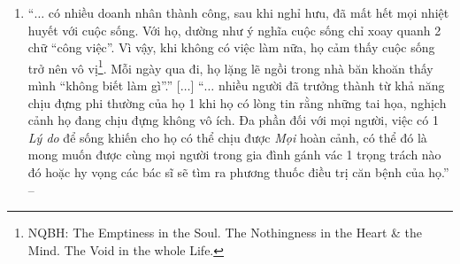 \documentclass[oneside]{book}
\numberwithin{equation}{section}
\begin{document}
\begin{enumerate}[leftmargin=0mm]
	``Frankl would have argued that we are never left with nothing as long as we retain\footnote{\textbf{retain} [v] \textbf{1.} \textbf{retain somebody\texttt{/}something} to keep somebody\texttt{/}something; to continue to have something \& not lose it or get rid of it; \textbf{2.} \textbf{retain something}to take in a substance \& keep holding it; \textbf{3.} \textbf{retain something} to remember or continue to hold something; \textbf{4.} \textbf{retain somebody\texttt{/}something} (\textit{law}) to employ a professional person such as a lawyer or doctor; to make regular payments to such a person in order to keep their services.} the freedom to choose how we will respond.'' -- \cite[Preface by \textsc{Harold S. Kushner}, p. 10]{Frankl2013}
	\item ``$\ldots$ có nhiều doanh nhân thành công, sau khi nghỉ hưu, đã mất hết mọi nhiệt huyết với cuộc sống. Với họ, dường như ý nghĩa cuộc sống chỉ xoay quanh 2 chữ ``công việc''. Vì vậy, khi không có việc làm nữa, họ cảm thấy cuộc sống trở nên vô vị\footnote{NQBH: The Emptiness in the Soul. The Nothingness in the Heart \& the Mind. The Void in the whole Life.}. Mỗi ngày qua đi, họ lặng lẽ ngồi trong nhà băn khoăn thấy mình ``không biết làm gì''.'' [$\ldots$] ``$\ldots$ nhiều người đã trưởng thành từ khả năng chịu đựng phi thường của họ 1 khi họ có lòng tin rằng những tai họa, nghịch cảnh họ đang chịu đựng không vô ích. Đa phần đối với mọi người, việc có 1 \textit{Lý do} để sống khiến cho họ có thể chịu được \textit{Mọi} hoàn cảnh, có thể đó là mong muốn được cùng mọi người trong gia đình gánh vác 1 trọng trách nào đó hoặc hy vọng các bác sĩ sẽ tìm ra phương thuốc điều trị căn bệnh của họ.'' -- \cite[p. 8]{Frankl2022}
	

\end{enumerate}
\end{document}

